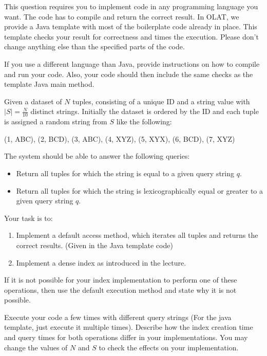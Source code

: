 \newpage
{}
This question requires you to implement code in any programming language you want.
The code has to compile and return the correct result.
In OLAT, we provide a Java template with most of the boilerplate code already in place.
This template checks your result for correctness and times the execution.
Please don't change anything else than the specified parts of the code.

If you use a different language than Java, provide instructions on how to compile and run your code.
Also, your code should then include the same checks as the template Java main method.

Given a dataset of $N$ tuples, consisting of a unique ID and a string value with $|S| = \frac{N}{10}$ distinct strings.
Initially the dataset is ordered by the ID and each tuple is assigned a random string from $S$ like the following:

\begin{center}
(1, ABC), (2, BCD), (3, ABC), (4, XYZ), (5, XYX), (6, BCD), (7, XYZ)
\end{center}

The system should be able to answer the following queries:
\begin{itemize}
  \item Return all tuples for which the string is equal to a given query string $q$.
  \item Return all tuples for which the string is lexicographically equal or greater to a given query string $q$.
\end{itemize}

Your task is to:
\begin{enumerate}
  \item Implement a default access method, which iterates all tuples and returns the correct results. (Given in the Java template code)
  \item Implement a dense index as introduced in the lecture. 
\end{enumerate}


If it is not possible for your index implementation to perform one of these operations, then use the default execution method and state why it is not possible.

Execute your code a few times with different query strings (For the java template, just execute it multiple times).
Describe how the index creation time and query times for both operations differ in your implementations.
You may change the values of $N$ and $S$ to check the effects on your implementation.


